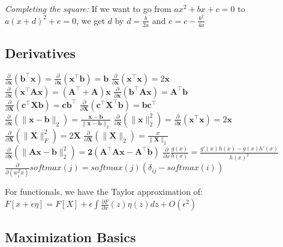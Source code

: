 \documentclass[9pt,parskip]{scrartcl}
\begin{document}
\begin{multicols*}{4}
\textit{Completing the square: }
If we want to go from $ax^2 + bx + c = 0$ to $a(x+d)^2 + e = 0$, 
we get $d$ by $d = \frac{b}{2a}$ and $e = c - \frac{b^2}{4a}$
\subsection*{Derivatives}
$\frac{\partial}{\partial \mathbf{x}}(\mathbf{b}^\top \mathbf{x}) = \frac{\partial}{\partial \mathbf{x}}(\mathbf{x}^\top \mathbf{b}) = \mathbf{b}$ \quad
$\frac{\partial}{\partial \mathbf{x}}(\mathbf{x}^\top \mathbf{x}) = 2\mathbf{x}$\\
$\frac{\partial}{\partial \mathbf{x}}(\mathbf{x}^\top \mathbf{A}\mathbf{x}) = (\mathbf{A}^\top + \mathbf{A})\mathbf{x}$ \quad
$\frac{\partial}{\partial \mathbf{x}}(\mathbf{b}^\top \mathbf{A}\mathbf{x}) = \mathbf{A}^\top \mathbf{b}$\\
$\frac{\partial}{\partial \mathbf{X}}(\mathbf{c}^\top \mathbf{X} \mathbf{b}) = \mathbf{c}\mathbf{b}^\top$ \quad
$\frac{\partial}{\partial \mathbf{X}}(\mathbf{c}^\top \mathbf{X}^\top \mathbf{b}) = \mathbf{b}\mathbf{c}^\top$\\
$\frac{\partial}{\partial \mathbf{x}}(\| \mathbf{x}-\mathbf{b} \|_2) = \frac{\mathbf{x}-\mathbf{b}}{\|\mathbf{x}-\mathbf{b}\|_2}$ \quad
$\frac{\partial}{\partial \mathbf{x}}(\|\mathbf{x}\|^2_2) = \frac{\partial}{\partial \mathbf{x}} (\mathbf{x}^\top \mathbf{x}) = 2\mathbf{x}$\\
$\frac{\partial}{\partial \mathbf{X}}(\|\mathbf{X}\|_F^2) = 2\mathbf{X}$ \quad
$\frac{\partial}{\partial \mathbf{X}}(\|\mathbf{X}\|_2) = \frac{x}{\|\mathbf{X}\|_2}$ \\ 

$\frac{\partial}{\partial \mathbf{x}}(\|\mathbf{Ax - b}\|_2^2) = \mathbf{2(A^\top Ax-A^\top b)}$
$\frac{\partial}{\partial x}\frac{g(x)}{h(x)} = \frac{g'(x)h(x) - g(x)h'(x)}{h(x)^2}$\\
$\frac{\partial}{\partial(w_i^Tx)}softmax(j)= softmax(j)(\delta_{ij} - softmax(i))$

For functionals, we have the Taylor approximation of: $F[x + \epsilon \eta] = F[X] + \epsilon \int \frac{\partial F}{\partial x}(z) \eta (z) dz + O(\epsilon ^2)$

\subsection*{Maximization Basics}

\end{multicols*}
\end{document}
